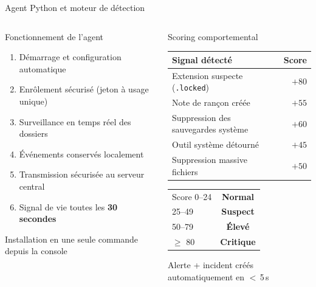 \documentclass[aspectratio=169,t,10pt]{beamer}
\begin{document}
\begin{frame}{Agent Python et moteur de détection}

  \begin{columns}[T]
      \begin{block}{Fonctionnement de l'agent}
        \small
        \begin{enumerate}\setlength\itemsep{2pt}
          \item Démarrage et configuration automatique
          \item Enrôlement sécurisé (jeton à usage unique)
          \item Surveillance en temps réel des dossiers
          \item Événements conservés localement
          \item Transmission sécurisée au serveur central
          \item Signal de vie toutes les \textbf{30 secondes}
        \end{enumerate}
        \vspace{5pt}
        {\tiny\color{muted} Installation en une seule commande depuis la console}
      \end{block}

      \begin{block}{Scoring comportemental}
        \small
        \renewcommand{\arraystretch}{1.2}
        \begin{tabular}{@{}l r@{}}
          \toprule
          \textbf{Signal détecté} & \textbf{Score} \\
          \midrule
          Extension suspecte (\texttt{.locked}) & $+80$ \\
          Note de rançon créée                  & $+55$ \\
          Suppression des sauvegardes système    & $+60$ \\
          Outil système détourné                & $+45$ \\
          Suppression massive fichiers          & $+50$ \\
          \bottomrule
        \end{tabular}
        \vspace{5pt}

        \begin{tabular}{@{}l c@{}}
          Score 0–24    & \textcolor{norm}{\textbf{Normal}}   \\
          25–49         & \textcolor{high}{\textbf{Suspect}}  \\
          50–79         & \textcolor{high}{\textbf{Élevé}}   \\
          $\geq$ 80     & \textcolor{crit}{\textbf{Critique}} \\
        \end{tabular}
        \vspace{3pt}
        {\tiny\color{muted} Alerte + incident créés automatiquement en $<$\,5\,s}
      \end{block}
  \end{columns}

\end{frame}
\end{document}
